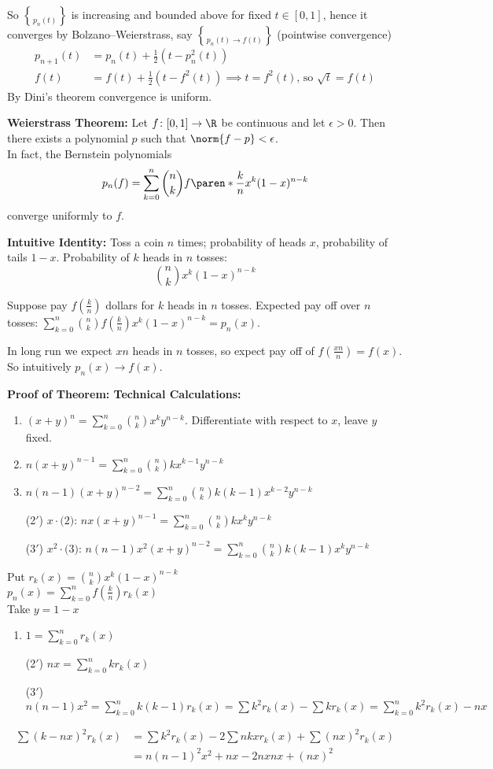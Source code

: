 So $\brace{p_n(t)}$ is increasing and bounded above for fixed $t\in[0,1]$, hence it converges by Bolzano--Weierstrass, say $\brace{p_n(t)}\to f(t)$ (pointwise convergence)
\begin{align*}
p_{n+1}(t) &= p_n(t) + \tfrac12(t-p_n^2(t)) \\
f(t) &= f(t) + \tfrac12(t-f^2(t)) \implies t = f^2(t)\text{, so }\sqrt t=f(t)
\end{align*}
By Dini's theorem convergence is uniform.

\textbf{Weierstrass Theorem: }Let $f\colon[0,1]\to\R$ be continuous and let $\epsilon>0$.  Then there exists a polynomial $p$ such that $\norm{f-p}<\epsilon$. \\
In fact, the Bernstein polynomials
\[ p_n(f) = \sum_{k=0}^n \binom{n}{k} f\paren*{\frac{k}{n}} x^k (1-x)^{n-k} \]
converge uniformly to $f$.

\textbf{Intuitive Identity: }Toss a coin $n$ times; probability of heads $x$, probability of tails $1-x$.  Probability of $k$ heads in $n$ tosses:
\[ \binom{n}{k} x^k (1-x)^{n-k} \]

Suppose pay $f(\frac kn)$ dollars for $k$ heads in $n$ tosses.  Expected pay off over $n$ tosses: $\sum_{k=0}^n\binom nkf(\frac kn)x^k(1-x)^{n-k}=p_n(x)$.

In long run we expect $xn$ heads in $n$ tosses, so expect pay off of $f(\frac{xn}{n})=f(x)$.  So intuitively $p_n(x)\to f(x)$.

\textbf{Proof of Theorem: Technical Calculations:}
\begin{enumerate}[label=(\arabic*)]
\item $(x+y)^n=\sum_{k=0}^n\binom nkx^ky^{n-k}$.  Differentiate with respect to $x$, leave $y$ fixed.
\item $n(x+y)^{n-1}=\sum_{k=0}^n\binom nkkx^{k-1}y^{n-k}$
\item $n(n-1)(x+y)^{n-2}=\sum_{k=0}^n\binom nk k(k-1)x^{k-2}y^{n-k}$
\item[(2$'$)] $x\cdot\text{(2)}$: $nx(x+y)^{n-1}=\sum_{k=0}^n\binom nkkx^ky^{n-k}$
\item[(3$'$)] $x^2\cdot\text{(3)}$: $n(n-1)x^2(x+y)^{n-2}=\sum_{k=0}^n\binom nk k(k-1)x^ky^{n-k}$
\end{enumerate}
Put $r_k(x)=\binom nkx^k(1-x)^{n-k}$ \\
$p_n(x)=\sum_{k=0}^n f(\frac kn)r_k(x)$ \\
Take $y=1-x$
\begin{enumerate}[label=(\arabic*)]
\item $1=\sum_{k=0}^n r_k(x)$
\item[(2$'$)] $nx=\sum_{k=0}^n kr_k(x)$
\item[(3$'$)] $n(n-1)x^2=\sum_{k=0}^n k(k-1)r_k(x)=\sum k^2r_k(x)-\sum k r_k(x)=\sum_{k=0}^n k^2 r_k(x)-nx$
\end{enumerate}
\begin{align*}
\sum (k-nx)^2 r_k(x) &= \sum k^2 r_k(x) - 2\sum nkxr_k(x) + \sum (nx)^2 r_k(x) \\
&= n(n-1)^2x^2 + nx - 2nxnx + (nx)^2
\end{align*}